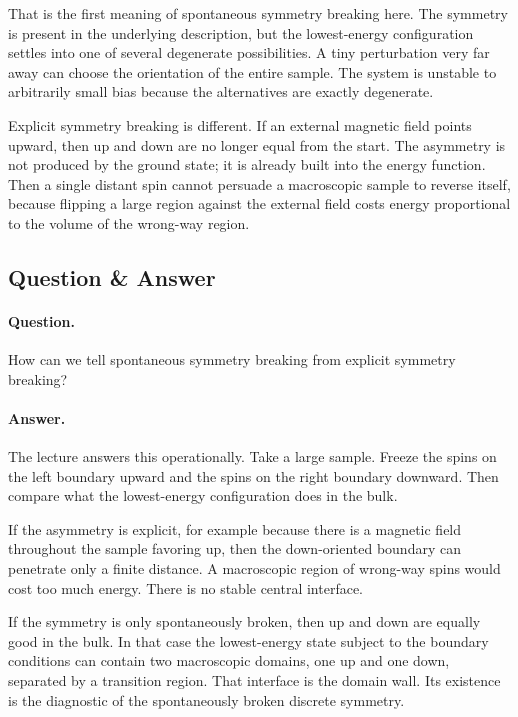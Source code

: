 That is the first meaning of spontaneous symmetry breaking here. The symmetry is present in the underlying description, but the lowest-energy configuration settles into one of several degenerate possibilities. A tiny perturbation very far away can choose the orientation of the entire sample. The system is unstable to arbitrarily small bias because the alternatives are exactly degenerate.

Explicit symmetry breaking is different. If an external magnetic field points upward, then up and down are no longer equal from the start. The asymmetry is not produced by the ground state; it is already built into the energy function. Then a single distant spin cannot persuade a macroscopic sample to reverse itself, because flipping a large region against the external field costs energy proportional to the volume of the wrong-way region.

\subsection{Question \& Answer}

\paragraph{Question.} How can we tell spontaneous symmetry breaking from explicit symmetry breaking?

\paragraph{Answer.} The lecture answers this operationally. Take a large sample. Freeze the spins on the left boundary upward and the spins on the right boundary downward. Then compare what the lowest-energy configuration does in the bulk.

If the asymmetry is explicit, for example because there is a magnetic field throughout the sample favoring up, then the down-oriented boundary can penetrate only a finite distance. A macroscopic region of wrong-way spins would cost too much energy. There is no stable central interface.

If the symmetry is only spontaneously broken, then up and down are equally good in the bulk. In that case the lowest-energy state subject to the boundary conditions can contain two macroscopic domains, one up and one down, separated by a transition region. That interface is the domain wall. Its existence is the diagnostic of the spontaneously broken discrete symmetry.


